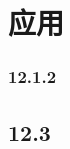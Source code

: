 \chapter{应用}
\label{chap:12}


\subsection{12.1.2}
\label{sec:12.1.2}

\section{12.3}
\label{sec:12.3}